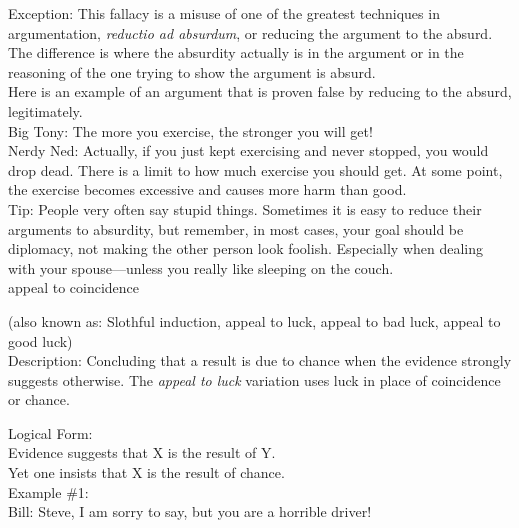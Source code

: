 \documentclass[a4paper,12pt,single,pdftex]{scrartcl}
\begin{document}
    
      Exception: This fallacy is a misuse of one of the greatest techniques in argumentation, {\it reductio ad absurdum}, or reducing the argument to the absurd.  The difference is where the absurdity actually is in the argument or in the reasoning of the one trying to show the argument is absurd.
    \\

    
      Here is an example of an argument that is proven false by reducing to the absurd, legitimately.
    \\

    
      Big Tony: The more you exercise, the stronger you will get!
    \\

    
      Nerdy Ned: Actually, if you just kept exercising and never stopped, you would drop dead. There is a limit to how much exercise you should get. At some point, the exercise becomes excessive and causes more harm than good.
    \\

    
      Tip: People very often say stupid things.  Sometimes it is easy to reduce their arguments to absurdity, but remember, in most cases, your goal should be diplomacy, not making the other person look foolish.  Especially when dealing with your spouse—unless you really like sleeping on the couch.
    \\

  

appeal to coincidence
    
      (also known as: Slothful induction, appeal to luck, appeal to bad luck, appeal to good luck)
    \\

  
    Description: Concluding that a result is due to chance when the evidence strongly suggests otherwise.  The {\it appeal to luck}  variation uses luck in place of coincidence or chance.

    
      Logical Form:
    \\

    
      Evidence suggests that X is the result of Y.
    \\

    
      Yet one insists that X is the result of chance.
    \\

    
      Example \#1: 
    \\

    
      Bill: Steve, I am sorry to say, but you are a horrible driver!
    \\
\end{document}
